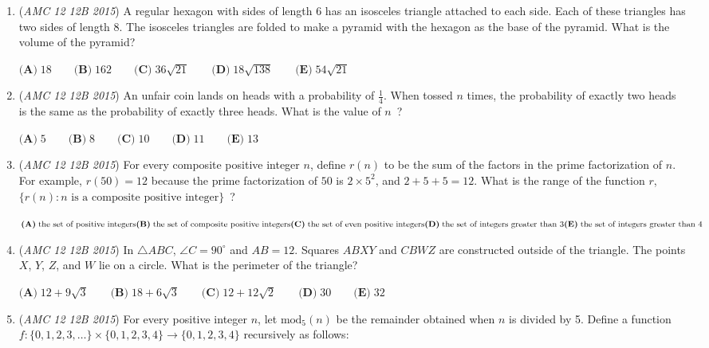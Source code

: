 \begin{enumerate}
	\item (\textit{AMC 12 12B 2015}) A regular hexagon with sides of length 6 has an isosceles triangle attached to each side. Each of these triangles has two sides of length 8. The isosceles triangles are folded to make a pyramid with the hexagon as the base of the pyramid. What is the volume of the pyramid?


 $\textbf{(A)}\; 18 \qquad\textbf{(B)}\; 162 \qquad\textbf{(C)}\; 36\sqrt{21} \qquad\textbf{(D)}\; 18\sqrt{138} \qquad\textbf{(E)}\; 54\sqrt{21}$


	\item (\textit{AMC 12 12B 2015}) An unfair coin lands on heads with a probability of $\frac{1}{4}$. When tossed $n$ times, the probability of exactly two heads is the same as the probability of exactly three heads. What is the value of $n$ ?


 $\textbf{(A)}\; 5 \qquad\textbf{(B)}\; 8 \qquad\textbf{(C)}\; 10 \qquad\textbf{(D)}\; 11 \qquad\textbf{(E)}\; 13$


	\item (\textit{AMC 12 12B 2015}) For every composite positive integer $n$, define $r(n)$ to be the sum of the factors in the prime factorization of $n$. For example, $r(50) = 12$ because the prime factorization of $50$ is $2 \times 5^{2}$, and $2 + 5 + 5 = 12$. What is the range of the function $r$, $\{r(n): n \text{ is a composite positive integer}\}$ ?


 $\textbf{(A)}\; \text{the set of positive integers} \\ \textbf{(B)}\; \text{the set of composite positive integers} \\ \textbf{(C)}\; \text{the set of even positive integers} \\ \textbf{(D)}\; \text{the set of integers greater than 3} \\ \textbf{(E)}\; \text{the set of integers greater than 4}$


	\item (\textit{AMC 12 12B 2015}) In $\triangle ABC$, $\angle C = 90^\circ$ and $AB = 12$. Squares $ABXY$ and $CBWZ$ are constructed outside of the triangle. The points $X$, $Y$, $Z$, and $W$ lie on a circle. What is the perimeter of the triangle?


 $\textbf{(A)}\; 12+9\sqrt{3} \qquad\textbf{(B)}\; 18+6\sqrt{3} \qquad\textbf{(C)}\; 12+12\sqrt{2} \qquad\textbf{(D)}\; 30 \qquad\textbf{(E)}\; 32$


	\item (\textit{AMC 12 12B 2015}) For every positive integer $n$, let $\text{mod}_5 (n)$ be the remainder obtained when $n$ is divided by 5. Define a function $f: \{0,1,2,3,\dots\} \times \{0,1,2,3,4\} \to \{0,1,2,3,4\}$ recursively as follows:



\end{enumerate}
